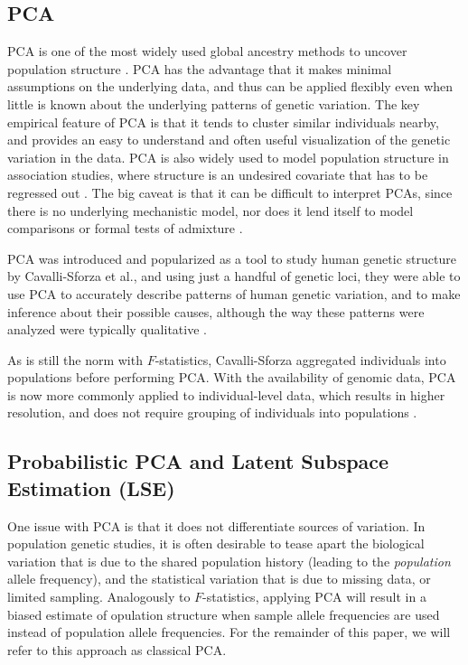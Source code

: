 \documentclass[12pt]{article}
\begin{document}
\subsection{PCA}
PCA is one of the most widely used global ancestry methods to uncover population structure \citep{cavalli-sforza_analysis_1975, mcvean_genealogical_2009, engelhardt_analysis_2010}. PCA has the advantage that it makes minimal assumptions on the underlying data, and thus can be applied flexibly even when little is known about the underlying patterns of genetic variation. The key empirical feature of PCA is that it tends to cluster similar individuals nearby, and provides an easy to understand and often useful visualization of the genetic variation in the data. PCA is also widely used to model population structure in association studies, where structure is an undesired covariate that has to be regressed out \citep{price_principal_2006}. The big caveat is that it can be difficult to interpret PCAs, since there is no underlying mechanistic model, nor does it lend itself to model comparisons or formal tests of admixture \citep{mcvean_genealogical_2009, novembre_interpreting_2008}.


PCA was introduced and popularized as a tool to study human genetic structure by Cavalli-Sforza et al., and using just a handful of genetic loci, they were able to use PCA to accurately describe patterns of human genetic variation, and to make inference about their possible causes, although the way these patterns were analyzed were typically qualitative \citep{menozzi_synthetic_1978, sforza_great_1995, l_l_cavalli-sforza_history_1996}.

As is still the norm with $F$-statistics, Cavalli-Sforza aggregated individuals into populations before performing PCA. With the availability of genomic data, PCA is now more commonly applied to individual-level data, which results in higher resolution, and does not require grouping of individuals into populations \citep{patterson_population_2006, novembre_genes_2008, price_principal_2006}.


\subsection{Probabilistic PCA and Latent Subspace Estimation (LSE)}
One issue with PCA is that it does not differentiate sources of variation. In population genetic studies, it is often desirable to tease apart the biological variation that is due to the shared population history (leading to the \textit{population} allele frequency), and the statistical variation that is due to missing data, or limited sampling. Analogously to $F$-statistics, applying PCA will result in a biased estimate of opulation structure when sample allele frequencies are used instead of population allele frequencies. For the remainder of this paper, we will refer to this approach as classical PCA.
\end{document}
